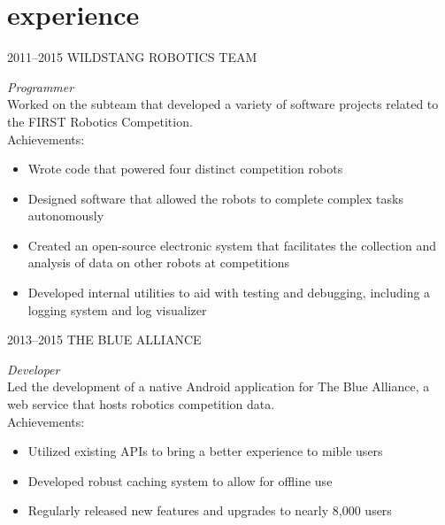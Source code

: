 \documentclass[print]{resume} %
\begin{document}

\section{experience}


\begin{entrylist}


\entry
{2011--2015}
{WILDSTANG ROBOTICS TEAM}
{}
{\emph{Programmer} \\
Worked on the subteam that developed a variety of software projects related to the FIRST Robotics Competition. \\
Achievements:
\begin{itemize}
\item Wrote code that powered four distinct competition robots
\item Designed software that allowed the robots to complete complex tasks autonomously
\item Created an open-source electronic system that facilitates the collection and analysis of data on other robots at competitions
\item Developed internal utilities to aid with testing and debugging, including a logging system and log visualizer
\end{itemize}}


\entry
{2013--2015}
{THE BLUE ALLIANCE}
{}
{\emph{Developer} \\
Led the development of a native Android application for The Blue Alliance, a web service that hosts robotics competition data. \\
Achievements:
\begin{itemize}
\item Utilized existing APIs to bring a better experience to mible users
\item Developed robust caching system to allow for offline use
\item Regularly released new features and upgrades to nearly 8,000 users
\end{itemize}}

\end{entrylist}
\end{document}

